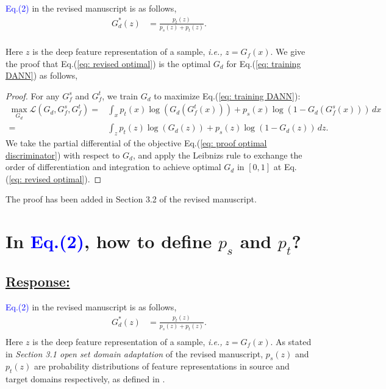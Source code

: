 \textcolor{blue}{Eq.(2)} in the revised manuscript is as follows,
\begin{equation}
    \label{eq: revised optimal}
    \begin{split}
        G_d^*(z) &= \frac{p_t(z)}{p_s(z)+p_t(z)}. \\
    \end{split}
\end{equation}

Here $z$ is the deep feature representation of a sample, \textit{i.e.,} $z=G_f(x)$.
We give the proof that Eq.(\ref{eq: revised optimal}) is the optimal $G_d$ for Eq.(\ref{eq: training DANN}) as follows,
\begin{proof}
    For any $G_f^s$ and $G_f^t$, we train $G_d$ to maximize Eq.(\ref{eq: training DANN}):
    \begin{equation}
        \label{eq: proof optimal discriminator}
        \begin{split}
            \max_{G_d} \mathscr{L}(G_d,G^{s}_{f},G_f^t)  = &\int_x p_t(x)\log \left(G_d\left(G_f^t\left(x\right)\right)\right)
              + p_s(x) \log\left(1-G_d\left(G_f^s\left(x\right)\right)\right) \, dx
            \\ = &\int_z p_t(z)\log \left(G_d\left(z\right)\right)
              + p_s(z) \log\left(1-G_d\left(z\right)\right) \, dz.
        \end{split}
    \end{equation}
    We take the partial differential of the objective Eq.(\ref{eq: proof optimal discriminator}) with respect to $G_d$, and apply the Leibnizs rule to exchange the order of differentiation and integration to achieve optimal $G_d$ in $[0, 1]$ at Eq.(\ref{eq: revised optimal}).
\end{proof}

The proof has been added in Section 3.2 of the revised manuscript.

\section{In \textcolor{blue}{Eq.(2)}, how to define $p_s$ and $p_t$?}
\subsection*{\underline{\textbf{Response:}}}

\textcolor{blue}{Eq.(2)} in the revised manuscript is as follows,
\begin{equation}
    \label{eq: revised optimal 1}
    \begin{split}
        G_d^*(z) &= \frac{p_t(z)}{p_s(z)+p_t(z)}. \\
    \end{split}
\end{equation}
Here $z$ is the deep feature representation of a sample, \textit{i.e.,} $z=G_f(x)$.
As stated in \textit{Section 3.1 open set domain adaptation} of the revised manuscript, $p_s (z)$ and $p_t (z)$ are probability distributions of feature representations in source and target domains respectively, as defined in \cite{PartialDA-iw}.


